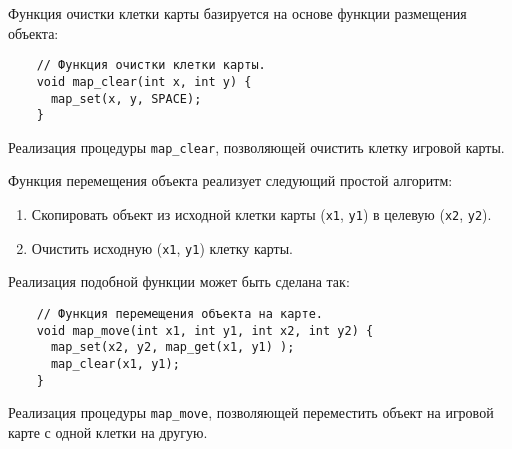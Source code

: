 \documentclass[../sparc.tex]{subfiles}
\begin{document}
Функция очистки клетки карты базируется на основе функции размещения объекта:

\begin{listing}[H]
  \begin{verbatim}
    // Функция очистки клетки карты.
    void map_clear(int x, int y) {
      map_set(x, y, SPACE);
    }
  \end{verbatim}
  \caption{Реализация процедуры \texttt{map\_clear}, позволяющей очистить клетку
    игровой карты.}
  \label{listing:game-dev-map-get--procedure}
\end{listing}

Функция перемещения объекта реализует следующий простой алгоритм:
\begin{enumerate}
\item Скопировать объект из исходной клетки карты (\texttt{x1}, \texttt{y1}) в
  целевую (\texttt{x2}, \texttt{y2}).
\item Очистить исходную (\texttt{x1}, \texttt{y1}) клетку карты.
\end{enumerate}

Реализация подобной функции может быть сделана так:

\begin{listing}[H]
  \begin{verbatim}
    // Функция перемещения объекта на карте.
    void map_move(int x1, int y1, int x2, int y2) {
      map_set(x2, y2, map_get(x1, y1) );
      map_clear(x1, y1);
    }
  \end{verbatim}
  \caption{Реализация процедуры \texttt{map\_move}, позволяющей переместить
    объект на игровой карте с одной клетки на другую.}
  \label{listing:game-dev-map-move---procedure}
\end{listing}
\end{document}
